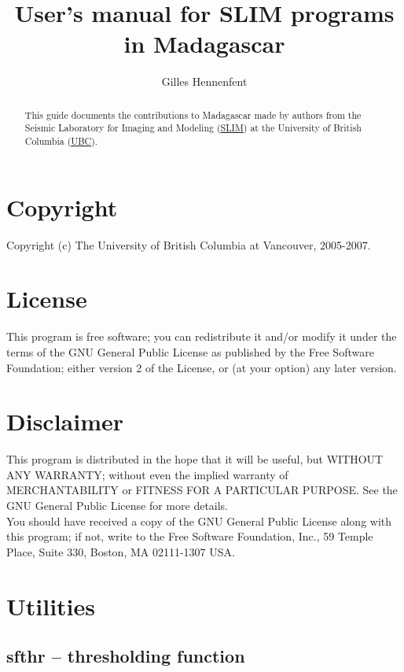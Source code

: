 \title{User's manual for SLIM programs in Madagascar}
\author{Gilles Hennenfent}

\maketitle

\begin{abstract}
  This guide documents the contributions to Madagascar made by authors
  from the Seismic Laboratory for Imaging and Modeling
  (\href{http://slim.eos.ubc.ca}{SLIM}) at the University of British
  Columbia (\href{http://www.ubc.ca}{UBC}).
\end{abstract}

\section{Copyright}
%
Copyright (c) The University of British Columbia at Vancouver,
2005-2007.

\section{License}
%
\noindent This program is free software; you can redistribute it
and/or modify it under the terms of the GNU General Public License as
published by the Free Software Foundation; either version 2 of the
License, or (at your option) any later version.

\section{Disclaimer}
%
This program is distributed in the hope that it will be useful, but
WITHOUT ANY WARRANTY; without even the implied warranty of
MERCHANTABILITY or FITNESS FOR A PARTICULAR PURPOSE.  See the GNU
General Public License for more details.\\
%
You should have received a copy of the GNU General Public License
along with this program; if not, write to the Free Software
Foundation, Inc., 59 Temple Place, Suite 330, Boston, MA 02111-1307
USA.

\newpage
\section{Utilities}
\subsection{sfthr -- thresholding function}

